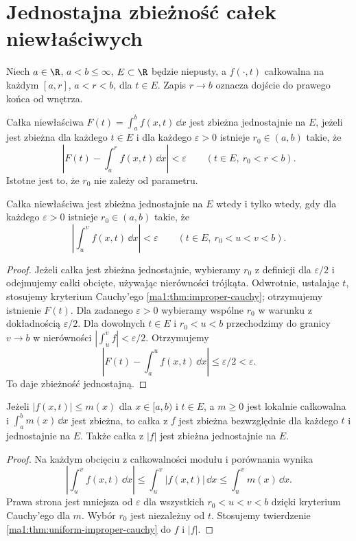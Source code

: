 \section{Jednostajna zbieżność całek niewłaściwych}
Niech $a\in\R$, $a<b\le\infty$, $E\subset\R$ będzie niepusty, a $f(\cdot,t)$ całkowalna na każdym $[a,r]$, $a<r<b$, dla $t\in E$. Zapis $r\to b$ oznacza dojście do prawego końca od wnętrza.

\begin{definicja}
\label{ma1:def:uniform-improper}
Całka niewłaściwa $F(t)=\int_a^b f(x,t)\,\dd x$ jest zbieżna jednostajnie na $E$, jeżeli jest zbieżna dla każdego $t\in E$ i dla każdego $\varepsilon>0$ istnieje $r_0\in(a,b)$ takie, że
\[
 \left|F(t)-\int_a^r f(x,t)\,\dd x\right|<\varepsilon
 \qquad(t\in E,\ r_0<r<b).
\]
Istotne jest to, że $r_0$ nie zależy od parametru.
\end{definicja}
\begin{twierdzenie}
\label{ma1:thm:uniform-improper-cauchy}
Całka niewłaściwa jest zbieżna jednostajnie na $E$ wtedy i tylko wtedy, gdy dla każdego $\varepsilon>0$ istnieje $r_0\in(a,b)$ takie, że
\[
 \left|\int_u^v f(x,t)\,\dd x\right|<\varepsilon
 \qquad(t\in E,\ r_0<u<v<b).
\]
\end{twierdzenie}
\begin{proof}
Jeżeli całka jest zbieżna jednostajnie, wybieramy $r_0$ z definicji dla $\varepsilon/2$ i odejmujemy całki obcięte, używając nierówności trójkąta. Odwrotnie, ustalając $t$, stosujemy kryterium Cauchy'ego \ref{ma1:thm:improper-cauchy}; otrzymujemy istnienie $F(t)$. Dla zadanego $\varepsilon>0$ wybieramy wspólne $r_0$ w warunku z dokładnością $\varepsilon/2$. Dla dowolnych $t\in E$ i $r_0<u<b$ przechodzimy do granicy $v\to b$ w nierówności $|\int_u^v f|<\varepsilon/2$. Otrzymujemy
\[
 \left|F(t)-\int_a^u f(x,t)\,\dd x\right|\le\varepsilon/2<\varepsilon.
\]
To daje zbieżność jednostajną.
\end{proof}
\begin{twierdzenie}
\label{ma1:thm:uniform-improper-majorant}
Jeżeli $|f(x,t)|\le m(x)$ dla $x\in[a,b)$ i $t\in E$, a $m\ge0$ jest lokalnie całkowalna i $\int_a^b m(x)\,\dd x$ jest zbieżna, to całka z $f$ jest zbieżna bezwzględnie dla każdego $t$ i jednostajnie na $E$. Także całka z $|f|$ jest zbieżna jednostajnie na $E$.
\end{twierdzenie}
\begin{proof}
Na każdym obcięciu z całkowalności modułu i porównania wynika
\[
 \left|\int_u^v f(x,t)\,\dd x\right|
 \le\int_u^v |f(x,t)|\,\dd x\le\int_u^v m(x)\,\dd x.
\]
Prawa strona jest mniejsza od $\varepsilon$ dla wszystkich $r_0<u<v<b$ dzięki kryterium Cauchy'ego dla $m$. Wybór $r_0$ jest niezależny od $t$. Stosujemy twierdzenie \ref{ma1:thm:uniform-improper-cauchy} do $f$ i $|f|$.
\end{proof}

